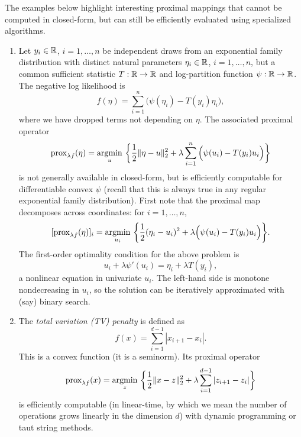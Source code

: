 \begin{Example}
\label{xa:proximal_mappings_efficient}
The examples below highlight interesting proximal mappings that cannot be 
computed in closed-form, but can still be efficiently evaluated using
specialized  algorithms.     

\begin{enumerate}[label=\alph*., ref=\alph*]
\item Let $y_i \in \mathbb{R}$, $i = 1,\dots,n$ be independent draws from an
  exponential family distribution with distinct natural parameters $\eta_i \in
  \mathbb{R}$, $i=1,\dots,n$, but a common sufficient statistic $T : \mathbb{R} \to \mathbb{R}$ and
  log-partition function $\psi : \mathbb{R} \to \mathbb{R}$. The negative log likelihood 
  is       
  \[
  f(\eta) = \sum_{i=1}^n \Big( \psi(\eta_i) - T(y_i) \eta_i \Big),
  \]
  where we have dropped terms not depending on $\eta$. The associated proximal
  operator 
  \[
  \operatorname{prox}_{\lambda f}(\eta) = \operatorname*{argmin}_{u} \, \bigg\{ \frac{1}{2} \|\eta - u\|_2^2
  + \lambda \sum_{i=1}^n \Big( \psi(u_i) - T(y_i) u_i \Big) \bigg\}
  \]
  is not generally available in closed-form, but is efficiently computable for
  differentiable convex $\psi$ (recall that this is always true in any regular
  exponential family distribution). First note that the proximal map decomposes
  across coordinates: for $i=1,\dots,n$,      
  \[
  [\operatorname{prox}_{\lambda f}(\eta)]_i = \operatorname*{argmin}_{u_i} \, \bigg\{ \frac{1}{2} (\eta_i - 
  u_i)^2 + \lambda \Big( \psi(u_i) - T(y_i) u_i \Big) \bigg\}. 
  \]
  The first-order optimality condition for the above problem is 
  \[
  u_i + \lambda \psi'(u_i) = \eta_i + \lambda T(y_i),
  \]
  a nonlinear equation in univariate $u_i$. The left-hand side is monotone
  nondecreasing in $u_i$, so the solution can be iteratively approximated with
  (say) binary search.       

\item {}
  The \emph{total variation (TV) penalty} is defined as
  \begin{equation}
  \label{eq:tv}
  f(x) = \sum_{i=1}^{d-1} |x_{i+1} - x_i|.
  \end{equation}
  This is a convex function (it is a seminorm). Its proximal operator    
  \[
  \operatorname{prox}_{\lambda f}(x) = \operatorname*{argmin}_z \, \bigg\{ \frac{1}{2} \|x - z\|_2^2 +  
  \lambda \sum_{i=1}^{d-1} |z_{i+1} - z_i| \bigg\}
  \]
  is efficiently computable (in linear-time, by which we mean the number of
  operations grows linearly in the dimension $d$) with dynamic programming or  
  taut string methods.       


\end{enumerate}
\end{Example}

